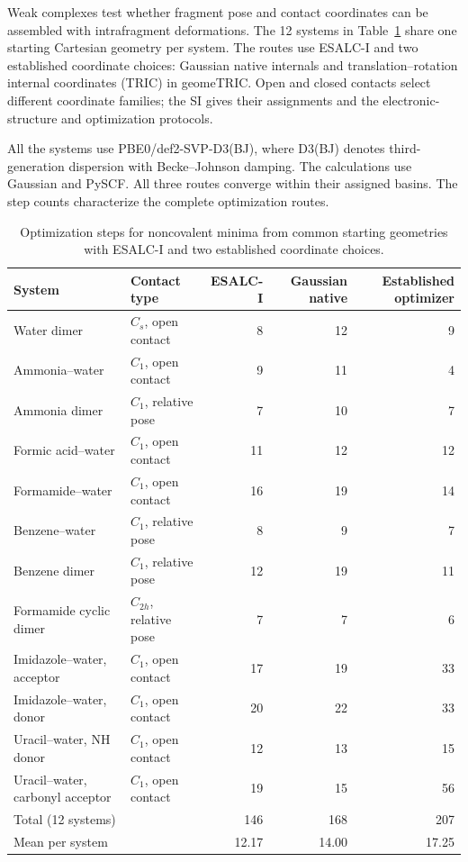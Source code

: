 \documentclass[journal=jctcce,manuscript=article,layout=traditional]{achemso}
\theoremstyle{definition}
\begin{document}
{Weak complexes test whether fragment pose and contact
coordinates can be assembled with intrafragment deformations.  The 12 systems
in Table~\ref{tab:cross-optimizer-coordinate-paths} share one
starting Cartesian geometry per system.  The routes use ESALC-I and two established coordinate choices: Gaussian
native internals and translation--rotation internal coordinates (TRIC) in
geomeTRIC.\cite{WangSong2016GeomeTRIC}  Open and closed contacts
select different coordinate families; the SI gives their assignments and
the electronic-structure and optimization protocols.}

{All the systems use PBE0/def2-SVP-D3(BJ), where D3(BJ) denotes third-generation dispersion with Becke--Johnson damping.\cite{AdamoBarone1999PBE0,WeigendAhlrichs2005Def2,GrimmeEhrlichGoerigk2011D3BJ} The calculations use Gaussian and PySCF.\cite{Sun2018PySCF}  All
three routes converge within their assigned basins.  The step counts characterize the complete optimization routes.}

\begin{table}[htbp]
\centering
\scriptsize
\setlength{\tabcolsep}{4.0pt}
\caption{{Optimization steps for noncovalent minima from common
starting geometries with ESALC-I and two established coordinate choices.}}
\label{tab:cross-optimizer-coordinate-paths}
\begin{tabularx}{\linewidth}{@{}l>{\raggedright\arraybackslash}Xrrr@{}}
\toprule
System & Contact type & ESALC-I & Gaussian native & Established optimizer \\
\midrule
Water dimer & \(C_s\), open contact & 8 & 12 & 9 \\
Ammonia--water & \(C_1\), open contact & 9 & 11 & 4 \\
Ammonia dimer & \(C_1\), relative pose & 7 & 10 & 7 \\
Formic acid--water & \(C_1\), open contact & 11 & 12 & 12 \\
Formamide--water & \(C_1\), open contact & 16 & 19 & 14 \\
Benzene--water & \(C_1\), relative pose & 8 & 9 & 7 \\
Benzene dimer & \(C_1\), relative pose & 12 & 19 & 11 \\
Formamide cyclic dimer & \(C_{2h}\), relative pose & 7 & 7 & 6 \\
Imidazole--water, acceptor & \(C_1\), open contact & 17 & 19 & 33 \\
Imidazole--water, donor & \(C_1\), open contact & 20 & 22 & 33 \\
Uracil--water, NH donor & \(C_1\), open contact & 12 & 13 & 15 \\
Uracil--water, carbonyl acceptor & \(C_1\), open contact & 19 & 15 & 56 \\
\midrule
Total (12 systems) & & 146 & 168 & 207 \\
Mean per system & & 12.17 & 14.00 & 17.25 \\
\bottomrule
\end{tabularx}
\end{table}
\end{document}
